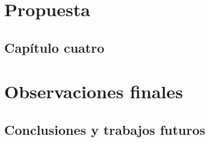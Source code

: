 \documentclass[a4paper,12pt,twoside]{book}
\theoremstyle{remark}
\begin{document}
\part{Propuesta}
\clearpage
\chapter{Capítulo cuatro}\label{capitulo:CapituloCuatro}

\clearpage
\part{Observaciones finales}
\clearpage
\chapter{Conclusiones y trabajos futuros}\label{capitulo:Conclusiones}

\clearpage

\printbibliography
\end{document}
